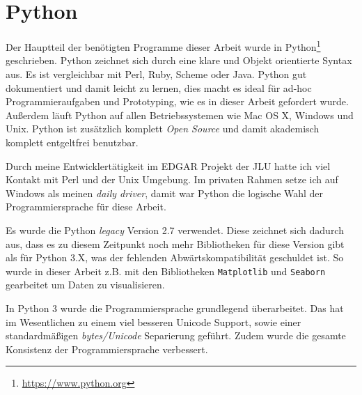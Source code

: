 


\section{Python}
Der Hauptteil der benötigten Programme dieser Arbeit wurde in Python\footnote{\url{https://www.python.org}} geschrieben. Python zeichnet sich durch eine klare und Objekt orientierte Syntax aus. Es ist vergleichbar mit Perl, Ruby, Scheme oder Java. Python gut dokumentiert und damit leicht zu lernen, dies macht es ideal für ad-hoc Programmieraufgaben und Prototyping, wie es in dieser Arbeit gefordert wurde. Außerdem läuft Python auf allen Betriebssystemen wie Mac OS X, Windows und Unix. Python ist zusätzlich komplett \emph{Open Source} und damit akademisch komplett entgeltfrei benutzbar. 

Durch meine Entwicklertätigkeit im EDGAR \cite{Yu.2017} Projekt der JLU hatte ich viel Kontakt mit Perl und der Unix Umgebung. Im privaten Rahmen setze ich auf Windows als meinen \emph{daily driver}, damit war Python die logische Wahl der Programmiersprache für diese Arbeit.

Es wurde die Python \emph{legacy} Version 2.7 verwendet. Diese zeichnet sich dadurch aus, dass es zu diesem Zeitpunkt noch mehr Bibliotheken für diese Version gibt als für Python 3.X, was der fehlenden Abwärtskompatibilität geschuldet ist. So wurde in dieser Arbeit z.B. mit den Bibliotheken \texttt{Matplotlib} und \texttt{Seaborn} gearbeitet um Daten zu visualisieren.

In Python 3 wurde die Programmiersprache grundlegend überarbeitet. Das hat im Wesentlichen zu einem viel besseren Unicode Support, sowie einer standardmäßigen \emph{bytes/Unicode} Separierung geführt. Zudem wurde die gesamte Konsistenz der Programmiersprache verbessert.
